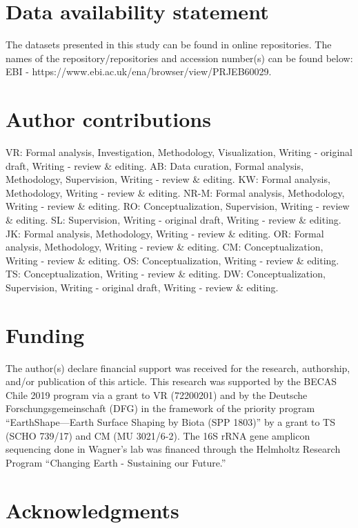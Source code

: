 \section*{Data availability statement}

The datasets presented in this study can be found in online repositories. The names of the repository/repositories and accession number(s) can be found below: EBI - https://www.ebi.ac.uk/ena/browser/view/PRJEB60029.

\section*{Author contributions}

VR: Formal analysis, Investigation, Methodology, Visualization, Writing - original draft, Writing - review \& editing. AB: Data curation, Formal analysis, Methodology, Supervision, Writing - review & editing. KW: Formal analysis, Methodology, Writing - review \& editing. NR-M: Formal analysis, Methodology, Writing - review \& editing. RO: Conceptualization, Supervision, Writing - review \& editing. SL: Supervision, Writing - original draft, Writing - review \& editing. JK: Formal analysis, Methodology, Writing - review \& editing. OR: Formal analysis, Methodology, Writing - review \& editing. CM: Conceptualization, Writing - review \& editing. OS: Conceptualization, Writing - review \& editing. TS: Conceptualization, Writing - review \& editing. DW: Conceptualization, Supervision, Writing - original draft, Writing - review \& editing.

\section*{Funding}

The author(s) declare financial support was received for the research, authorship, and/or publication of this article. This research was supported by the BECAS Chile 2019 program via a grant to VR (72200201) and by the Deutsche Forschungsgemeinschaft (DFG) in the framework of the priority program “EarthShape—Earth Surface Shaping by Biota (SPP 1803)” by a grant to TS (SCHO 739/17) and CM (MU 3021/6-2). The 16S rRNA gene amplicon sequencing done in Wagner's lab was financed through the Helmholtz Research Program “Changing Earth - Sustaining our Future.”

\section*{Acknowledgments}

